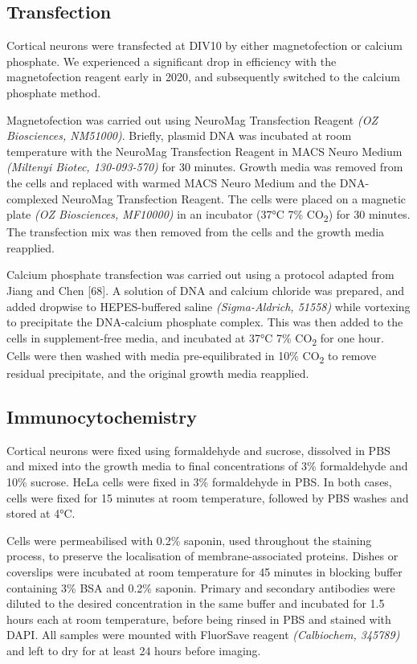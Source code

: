 \documentclass[
  12pt,
  a4paper,
]{book}
\begin{document}
\hypertarget{transfection}{%
\subsection{Transfection}\label{transfection}}

Cortical neurons were transfected at DIV10 by either magnetofection or calcium phosphate. We experienced a significant drop in efficiency with the magnetofection reagent early in 2020, and subsequently switched to the calcium phosphate method.

Magnetofection was carried out using NeuroMag Transfection Reagent \emph{(OZ Biosciences, NM51000)}. Briefly, plasmid DNA was incubated at room temperature with the NeuroMag Transfection Reagent in MACS Neuro Medium \emph{(Miltenyi Biotec, 130-093-570)} for 30 minutes. Growth media was removed from the cells and replaced with warmed MACS Neuro Medium and the DNA-complexed NeuroMag Transfection Reagent. The cells were placed on a magnetic plate \emph{(OZ Biosciences, MF10000)} in an incubator (37°C 7\% CO\textsubscript{2}) for 30 minutes. The transfection mix was then removed from the cells and the growth media reapplied.

Calcium phosphate transfection was carried out using a protocol adapted from Jiang and Chen {[}68{]}. A solution of DNA and calcium chloride was prepared, and added dropwise to HEPES-buffered saline \emph{(Sigma-Aldrich, 51558)} while vortexing to precipitate the DNA-calcium phosphate complex. This was then added to the cells in supplement-free media, and incubated at 37°C 7\% CO\textsubscript{2} for one hour. Cells were then washed with media pre-equilibrated in 10\% CO\textsubscript{2} to remove residual precipitate, and the original growth media reapplied.

\hypertarget{immuno}{%
\subsection{Immunocytochemistry}\label{immuno}}

Cortical neurons were fixed using formaldehyde and sucrose, dissolved in PBS and mixed into the growth media to final concentrations of 3\% formaldehyde and 10\% sucrose. HeLa cells were fixed in 3\% formaldehyde in PBS. In both cases, cells were fixed for 15 minutes at room temperature, followed by PBS washes and stored at 4°C.

Cells were permeabilised with 0.2\% saponin, used throughout the staining process, to preserve the localisation of membrane-associated proteins. Dishes or coverslips were incubated at room temperature for 45 minutes in blocking buffer containing 3\% BSA and 0.2\% saponin. Primary and secondary antibodies were diluted to the desired concentration in the same buffer and incubated for 1.5 hours each at room temperature, before being rinsed in PBS and stained with DAPI. All samples were mounted with FluorSave reagent \emph{(Calbiochem, 345789)} and left to dry for at least 24 hours before imaging.
\end{document}
